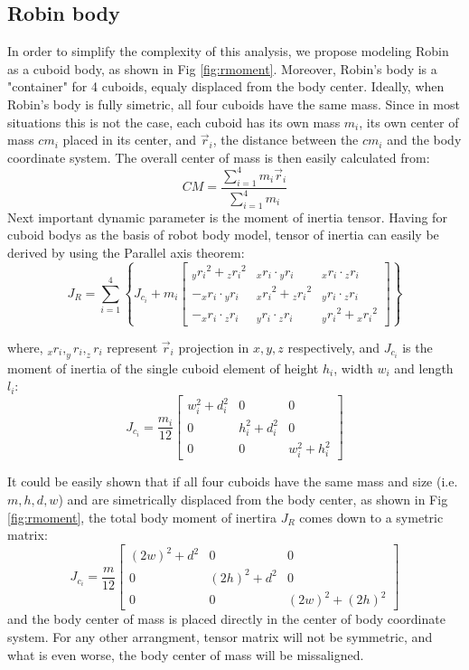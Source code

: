 \subsection{Robin body}
In order to simplify the complexity of this analysis, we propose modeling Robin as a cuboid body, as shown in Fig \ref{fig:rmoment}. Moreover, Robin's body is a "container" for 4 cuboids, equaly displaced from the body center. Ideally, when Robin's body is fully simetric, all four cuboids have the same mass. Since in most situations this is not the case, each cuboid has its own mass $m_i$, its own center of mass $cm_i$ placed in its center, and $\vec{r}_i$, the distance between the $cm_i$ and the body coordinate system. The overall center of mass is then easily calculated from: 
\begin{equation}
CM=\frac{\sum_{i=1}^{4}m_i\vec{r}_i}{\sum_{i=1}^{4}m_i}
\end{equation}
Next important dynamic parameter is the moment of inertia tensor. Having for cuboid bodys as the basis of robot body model, tensor of inertia can easily be derived by using the Parallel axis theorem:
\begin{equation}
J_R=\sum_{i=1}^{4}\left \{J_{c_i}+m_i\begin{bmatrix}
{_yr_i}^2+{_zr_i}^2 & {_xr_i}\cdot {_yr_i} & {_xr_i}\cdot {_zr_i} \\ 
-{_xr_i}\cdot {_yr_i} & {_xr_i}^2+{_zr_i}^2 & {_yr_i}\cdot {_zr_i}\\ 
-{_xr_i}\cdot {_zr_i} & {_yr_i}\cdot {_zr_i} & {_yr_i}^2+{_xr_i}^2
\end{bmatrix} \right \}
\end{equation}

where, $_xr_i, _yr_i, _zr_i$ represent $\vec{r}_i$ projection in $x,y,z$ respectively, and $J_{c_i}$ is the moment of inertia of the single cuboid element of height $h_i$, width $w_i$ and length $l_i$:
\begin{equation}
J_{c_i}=\frac{m_i}{12}\begin{bmatrix}
w_i^2+d_i^2 &0&0 \\ 
0 &h_i^2+d_i^2&0\\ 
0 &0& w_i^2+h_i^2
\end{bmatrix}
\end{equation} 

It could be easily shown that if all four cuboids have the same mass and size (i.e. $m,h,d,w$) and are simetrically displaced from the body center, as shown in Fig \ref{fig:rmoment}, the total body moment of inertira $J_R$ comes down to a symetric matrix:
\begin{equation}
J_{c_i}=\frac{m}{12}\begin{bmatrix}
(2w)^2+d^2 &0&0 \\ 
0 &(2h)^2+d^2&0\\ 
0 &0& (2w)^2+(2h)^2
\end{bmatrix}
\end{equation} 
and the body center of mass is placed directly in the center of body coordinate system. For any other arrangment, tensor matrix will not be symmetric, and what is even worse, the body center of mass will be missaligned.



